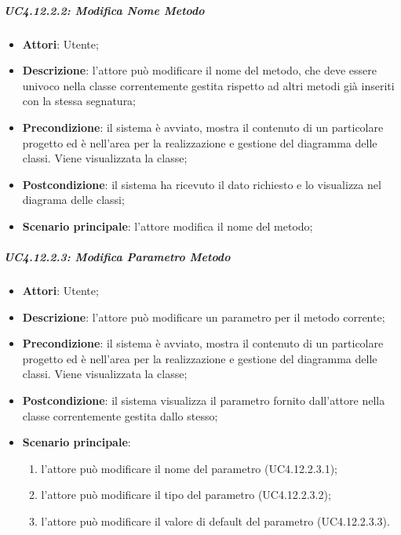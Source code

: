 \subparagraph{UC4.12.2.2: Modifica Nome Metodo}
\label{UC4.12.2.2}
\begin{itemize}
	\item \textbf{Attori}: Utente;
	\item \textbf{Descrizione}: l'attore può modificare il nome del metodo, che deve essere univoco nella classe correntemente gestita rispetto ad altri metodi già inseriti con la stessa segnatura;
	\item \textbf{Precondizione}: il sistema è avviato, mostra il contenuto di un particolare progetto ed è nell'area per la realizzazione e gestione del diagramma delle classi. Viene visualizzata la classe;
	\item \textbf{Postcondizione}: il sistema ha ricevuto il dato richiesto e lo visualizza nel diagrama delle classi;
	\item \textbf{Scenario principale}: l'attore modifica il nome del metodo;

\end{itemize}

\subparagraph{UC4.12.2.3: Modifica Parametro Metodo}
\label{UC4.12.2.3}
\begin{itemize}
	\item \textbf{Attori}: Utente;
	\item \textbf{Descrizione}: l'attore può modificare un parametro per il metodo corrente;
	\item \textbf{Precondizione}:  il sistema è avviato, mostra il contenuto di un particolare progetto ed è nell'area per la realizzazione e gestione del diagramma delle classi. Viene visualizzata la classe;
	\item \textbf{Postcondizione}: il sistema visualizza il parametro fornito dall'attore nella classe correntemente gestita dallo stesso;
	\item \textbf{Scenario principale}:
	\begin{enumerate}
		\item l'attore può modificare il nome del parametro (UC4.12.2.3.1);
		\item l'attore può modificare il tipo del parametro (UC4.12.2.3.2);
		\item l'attore può modificare il valore di default del parametro (UC4.12.2.3.3).
	\end{enumerate}
\end{itemize}

